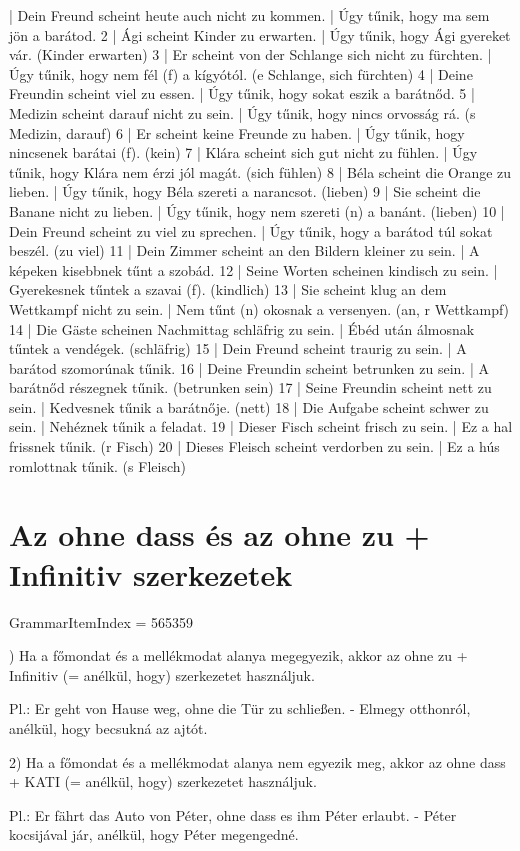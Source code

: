 \documentclass{article}
\newenvironment{desc}{\verbatim}{\endverbatim}
\newenvironment{exmp}{\verbatim}{\endverbatim}
\begin{document}
\begin{exmp}
1 | Dein Freund scheint heute auch nicht zu kommen. | Úgy tűnik, hogy ma sem jön a barátod.
2 | Ági scheint Kinder zu erwarten. | Úgy tűnik, hogy Ági gyereket vár. (Kinder erwarten)
3 | Er scheint von der Schlange sich nicht zu fürchten. | Úgy tűnik, hogy nem fél (f) a kígyótól. (e Schlange, sich fürchten)
4 | Deine Freundin scheint viel zu essen. | Úgy tűnik, hogy sokat eszik a barátnőd.
5 | Medizin scheint darauf nicht zu sein. | Úgy tűnik, hogy nincs orvosság rá. (s Medizin, darauf)
6 | Er scheint keine Freunde zu haben. | Úgy tűnik, hogy nincsenek barátai (f). (kein)
7 | Klára scheint sich gut nicht zu fühlen. | Úgy tűnik, hogy Klára nem érzi jól magát. (sich fühlen)
8 | Béla scheint die Orange zu lieben. | Úgy tűnik, hogy Béla szereti a narancsot. (lieben)
9 | Sie scheint die Banane nicht zu lieben. | Úgy tűnik, hogy nem szereti (n) a banánt. (lieben)
10 | Dein Freund scheint zu viel zu sprechen. | Úgy tűnik, hogy a barátod túl sokat beszél. (zu viel)
11 | Dein Zimmer scheint an den Bildern kleiner zu sein. | A képeken kisebbnek tűnt a szobád.
12 | Seine Worten scheinen kindisch zu sein. | Gyerekesnek tűntek a szavai (f). (kindlich)
13 | Sie scheint klug an dem Wettkampf nicht zu sein. | Nem tűnt (n) okosnak a versenyen. (an, r Wettkampf)
14 | Die Gäste scheinen Nachmittag schläfrig zu sein. | Ébéd után álmosnak tűntek a vendégek. (schläfrig)
15 | Dein Freund scheint traurig zu sein. | A barátod szomorúnak tűnik.
16 | Deine Freundin scheint betrunken zu sein. | A barátnőd részegnek tűnik. (betrunken sein)
17 | Seine Freundin scheint nett zu sein. | Kedvesnek tűnik a barátnője. (nett)
18 | Die Aufgabe scheint schwer zu sein. | Nehéznek tűnik a feladat.
19 | Dieser Fisch scheint frisch zu sein. | Ez a hal frissnek tűnik. (r Fisch)
20 | Dieses Fleisch scheint verdorben zu sein. | Ez a hús romlottnak tűnik. (s Fleisch)
\end{exmp}

\section{Az ohne dass és az ohne zu + Infinitiv szerkezetek}

GrammarItemIndex = 565359

\begin{desc}
1) Ha a főmondat és a mellékmodat alanya megegyezik, akkor az ohne zu + Infinitiv (= anélkül, hogy) szerkezetet használjuk.

Pl.: Er geht von Hause weg, ohne die Tür zu schließen. - Elmegy otthonról, anélkül, hogy becsukná az ajtót.

2) Ha a főmondat és a mellékmodat alanya nem egyezik meg, akkor az ohne dass + KATI (= anélkül, hogy) szerkezetet használjuk.

Pl.: Er fährt das Auto von Péter, ohne dass es ihm Péter erlaubt. - Péter kocsijával jár, anélkül, hogy Péter megengedné.
\end{desc}
\end{document}
